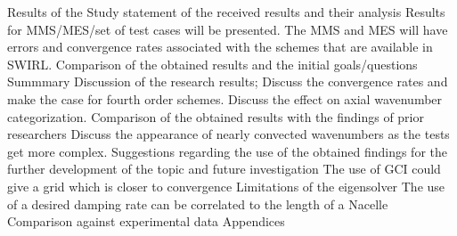 \documentclass[a4paper]{report}
\begin{document}
\begin{outline}[enumerate]
    \1 Results of the Study
    \2 statement of the received results and their analysis
    \3 Results for MMS/MES/set of test cases will be presented. The MMS and MES
    will have errors and convergence rates associated with the schemes that are
    available in SWIRL.
    \2 Comparison of the obtained results and the initial goals/questions
    \1 Summmary
    \2 Discussion of the research results;
    \3 Discuss the convergence rates and make the case for fourth order schemes.
    \3 Discuss the effect on axial wavenumber categorization. 
    \2 Comparison of the obtained results with the findings of prior researchers
    \3 Discuss the appearance of nearly convected wavenumbers as the tests get more complex.
    \2 Suggestions regarding the use of the obtained findings for the further
    development of the topic and future investigation 
    \3 The use of GCI could give a grid which is closer to convergence
    \3 Limitations of the eigensolver
    \3 The use of a desired damping rate can be correlated to the length of a 
    Nacelle
    \3 Comparison against experimental data
    \1 Appendices
\end{outline}
\end{document}
